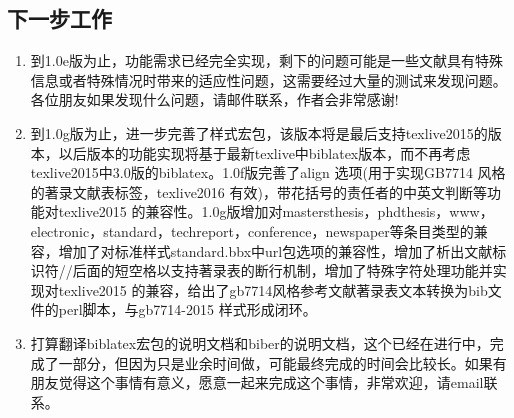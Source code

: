 \subsection{下一步工作}

\begin{enumerate}
  \item 到1.0e版为止，功能需求已经完全实现，剩下的问题可能是一些文献具有特殊信息或者特殊情况时带来的适应性问题，这需要经过大量的测试来发现问题。各位朋友如果发现什么问题，请邮件联系，作者会非常感谢!

  \item 到1.0g版为止，进一步完善了样式宏包，该版本将是最后支持texlive2015的版本，以后版本的功能实现将基于最新texlive中biblatex版本，而不再考虑texlive2015中3.0版的biblatex。1.0f版完善了align 选项(用于实现GB7714 风格的著录文献表标签，texlive2016 有效)，带花括号的责任者的中英文判断等功能对texlive2015 的兼容性。1.0g版增加对mastersthesis，phdthesis，www，electronic，standard，techreport，conference，newspaper等条目类型的兼容，增加了对标准样式standard.bbx中url包选项的兼容性，增加了析出文献标识符//后面的短空格以支持著录表的断行机制，增加了特殊字符处理功能并实现对texlive2015 的兼容，给出了gb7714风格参考文献著录表文本转换为bib文件的perl脚本，与gb7714-2015 样式形成闭环。
      
  \item 打算翻译biblatex宏包的说明文档和biber的说明文档，这个已经在进行中，完成了一部分，但因为只是业余时间做，可能最终完成的时间会比较长。如果有朋友觉得这个事情有意义，愿意一起来完成这个事情，非常欢迎，请email联系。

\end{enumerate}

